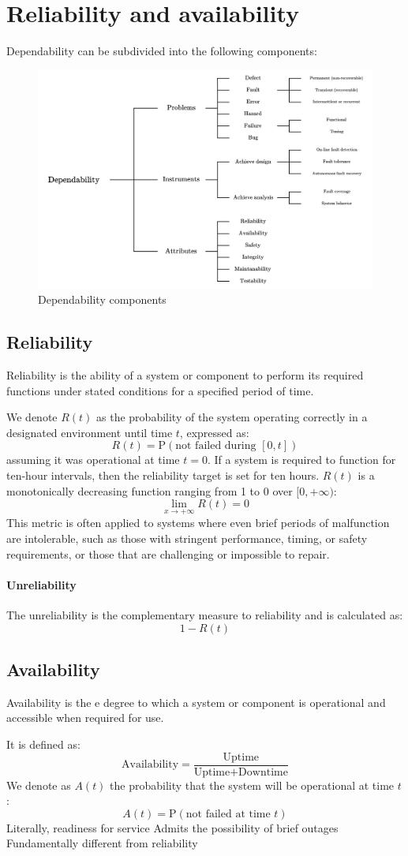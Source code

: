 \section{Reliability and availability}

Dependability can be subdivided into the following components:
\begin{figure}[H]
    \centering
    \includegraphics[width=0.6\linewidth]{images/dep1.png}
    \caption{Dependability components}
\end{figure}

\subsection{Reliability}
\begin{definition}
    Reliability is the ability of a system or component to perform its required functions under stated conditions for a specified period of time. 
\end{definition}
We denote $R(t)$ as the probability of the system operating correctly in a designated environment until time $t$, expressed as:
\[R(t)=\text{P}(\text{not failed during }[0,t])\]
assuming it was operational at time $t = 0$.
If a system is required to function for ten-hour intervals, then the reliability target is set for ten hours.
$R(t)$ is a monotonically decreasing function ranging from 1 to 0 over $[0,+\infty)$:
\[\lim_{x\rightarrow + \infty}R(t)=0\]
This metric is often applied to systems where even brief periods of malfunction are intolerable, such as those with stringent performance, timing, or safety requirements, or those that are challenging or impossible to repair.
\paragraph*{Unreliability}
The unreliability is the complementary measure to reliability and is calculated as:
\[1-R(t)\]

\subsection{Availability}
\begin{definition}
    Availability is the e degree to which a system or component is operational and accessible when required for use. 
\end{definition}
It is defined as: 
\[\text{Availability}=\dfrac{\text{Uptime}}{\text{Uptime}+\text{Downtime}}\]
We denote as $A(t)$ the probability that the system will be operational at time $t$: 
\[A(t)=\text{P}(\text{not failed at time }t)\]
Literally, readiness for service
Admits the possibility of brief outages
Fundamentally different from reliability
